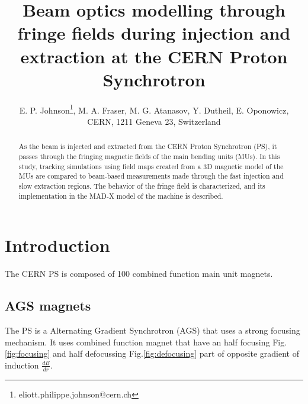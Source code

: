 \documentclass[a4paper,
               biblatex,     %
               keeplastbox,   %
               ]{jacow}
\begin{document}
\title{Beam optics modelling through fringe fields during injection and extraction at the CERN Proton Synchrotron}

\author{E. P. Johnson\thanks{eliott.philippe.johnson@cern.ch}, M. A. Fraser, M. G. Atanasov, Y. Dutheil, E. Oponowicz,\\ CERN, 1211 Geneva 23, Switzerland}
	
\maketitle

%
\begin{abstract}
As the beam is injected and extracted from the CERN Proton Synchrotron (PS), it passes through the fringing magnetic fields of the main bending units (MUs). In this study, tracking simulations using field maps created from a 3D magnetic model of the MUs are compared to beam-based measurements made through the fast injection and slow extraction regions. The behavior of the fringe field is characterized, and its implementation in the MAD-X model of the machine is described.
\end{abstract}


\section{Introduction}

The CERN PS is composed of 100 combined function main unit magnets.

\subsection{AGS magnets}
The PS is a Alternating Gradient Synchrotron (AGS) that uses a strong focusing mechanism. It uses combined function magnet that have an half focusing Fig.\ref{fig:focusing} and half defocussing Fig.\ref{fig:defocusing} part of opposite gradient of induction $\frac{dB}{dr}$.
\end{document}
